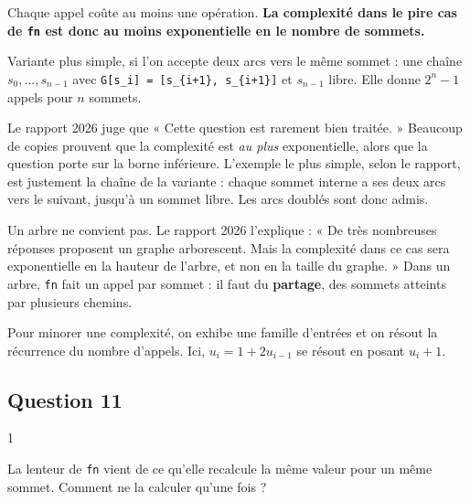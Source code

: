\documentclass[11pt,a4paper]{article}
\newcommand{\equationajustee}[1]{%
  \sbox{\boiteequation}{$\displaystyle #1$}%
  \ifdim\wd\boiteequation>\linewidth
    \[\resizebox{\linewidth}{!}{\usebox{\boiteequation}}\]%
  \else
    \[#1\]%
  \fi}
\begin{document}
\equationajustee{\boxed{C(x_m)=2^{n/2}-1}}

Chaque appel coûte au moins une opération. \textbf{La complexité dans le pire cas de \texttt{fn} est donc au moins exponentielle en le nombre de sommets.}

Variante plus simple, si l'on accepte deux arcs vers le même sommet : une chaîne \(s_0,\dots,s_{n-1}\) avec \texttt{G{[}s\_i{]}\allowbreak{}\ =\allowbreak{}\ {[}s\_\{i+1\},\allowbreak{}\ s\_\{i+1\}{]}\allowbreak{}} et \(s_{n-1}\) libre. Elle donne \(2^n-1\) appels pour \(n\) sommets.

\begin{jury}

Le rapport 2026 juge que « Cette question est rarement bien traitée. » Beaucoup de copies prouvent que la complexité est \emph{au plus} exponentielle, alors que la question porte sur la borne inférieure. L'exemple le plus simple, selon le rapport, est justement la chaîne de la variante : chaque sommet interne a ses deux arcs vers le suivant, jusqu'à un sommet libre. Les arcs doublés sont donc admis.

\end{jury}

\begin{piege}

Un arbre ne convient pas. Le rapport 2026 l'explique : « De très nombreuses réponses proposent un graphe arborescent. Mais la complexité dans ce cas sera exponentielle en la hauteur de l'arbre, et non en la taille du graphe. » Dans un arbre, \texttt{fn} fait un appel par sommet : il faut du \textbf{partage}, des sommets atteints par plusieurs chemins.

\end{piege}

\begin{methode}

Pour minorer une complexité, on exhibe une famille d'entrées et on résout la récurrence du nombre d'appels. Ici, \(u_i=1+2u_{i-1}\) se résout en posant \(u_i+1\).

\end{methode}

\hypertarget{question-11}{%
\subsection{Question 11}\label{question-11}}

\begin{indication}{1}

La lenteur de \texttt{fn} vient de ce qu'elle recalcule la même valeur pour un même sommet. Comment ne la calculer qu'une fois ?

\end{indication}
\end{document}
